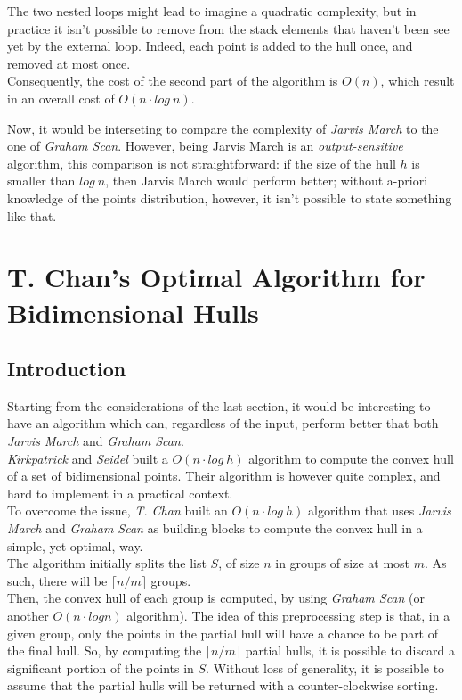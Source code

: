 \documentclass[
12pt,
a4paper,
oneside,
headinclude,
footinclude]{report}
\theoremstyle{definition} %
\begin{document}
The two nested loops might lead to imagine a quadratic complexity, but
in practice it isn't possible to remove from the stack elements that haven't been see yet by the external loop. Indeed, each point is added to the hull once, and removed at most once.\\
Consequently, the cost of the second part of the algorithm is $O(n)$, which result in an overall cost of $O(n\cdot log\ n)$.

Now, it would be interseting to compare the complexity of \textit{Jarvis March} to the one of \textit{Graham Scan}. However, being Jarvis March is an \textit{output-sensitive} algorithm,
this comparison is not straightforward: if the size of the hull $h$ is smaller than $log\ n$, then Jarvis March would perform better; without a-priori knowledge of the points distribution, however, it isn't possible to state something like that.


\section{T. Chan's Optimal Algorithm for Bidimensional Hulls}
\subsection{Introduction}
Starting from the considerations of the last section, it would be interesting to have an algorithm which can, regardless of the input, perform better that both \textit{Jarvis March} and \textit{Graham Scan}.\\
\textit{Kirkpatrick} and \textit{Seidel} \cite{Kirkpatrick_hull} built a $O(n\cdot log\ h)$ algorithm to compute the convex hull of a set of bidimensional points. Their algorithm is however quite complex, and hard to implement in a practical context.\\
To overcome the issue, \textit{T. Chan} \cite{Chan1996} built an $O(n\cdot log\ h)$ algorithm that uses \textit{Jarvis March} and \textit{Graham Scan} as building blocks to compute the convex hull in a simple, yet optimal, way.\\ 

The algorithm initially splits the list $S$, of size $n$ in groups of size at most $m$. As such, there will be $\lceil n/m \rceil$ groups. \\
Then, the convex hull of each group is computed, by using \textit{Graham Scan} (or another $O(n\cdot logn)$ algorithm).
The idea of this preprocessing step is that, in a given group, only the points in the partial hull will have a chance to be part of the final hull.
So, by computing the $\lceil n/m \rceil$ partial hulls, it is possible to discard a significant portion of the points in $S$.
Without loss of generality, it is possible to assume that the partial hulls will be returned with a counter-clockwise sorting.\\
\end{document}
